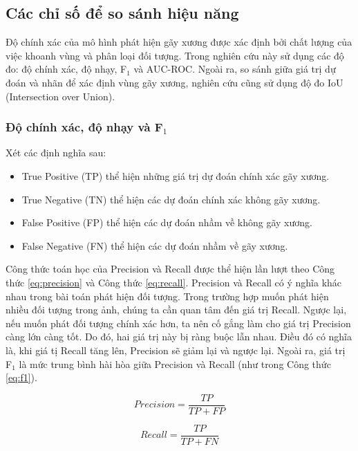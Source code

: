 \documentclass[../the.tex]{subfiles}
\begin{document}
\subsection{Các chỉ số để so sánh hiệu năng}

{\fontsize{13}{12} \selectfont
	Độ chính xác của mô hình phát hiện gãy xương được xác định bởi chất lượng của việc khoanh vùng và phân loại đối tượng. Trong nghiên cứu này sử dụng các độ đo: độ chính xác, độ nhạy, F$_1$ và AUC-ROC. Ngoài ra, so sánh giữa giá trị dự đoán và nhãn để xác định vùng gãy xương, nghiên cứu cũng sử dụng độ đo IoU (Intersection over Union).
}

\subsubsection*{Độ chính xác, độ nhạy và F$_1$}

{\fontsize{13}{12} \selectfont
	Xét các định nghĩa sau:
	\begin {itemize}
	\item True Positive (TP) thể hiện những giá trị dự đoán chính xác gãy xương.
	\item True Negative (TN) thể hiện các dự đoán chính xác không gãy xương.
	\item False Positive (FP) thể hiện các dự đoán nhầm về không gãy xương.
	\item False Negative (FN) thể hiện các dự đoán nhầm về gãy xương.
	\end {itemize}

	Công thức toán học của Precision và Recall được thể hiện lần lượt theo Công thức \ref{eq:precision} và Công thức \ref{eq:recall}. Precision và Recall có ý nghĩa khác nhau trong bài toán phát hiện đối tượng. Trong trường hợp muốn phát hiện nhiều đối tượng trong ảnh, chúng ta cần quan tâm đến giá trị Recall. Ngược lại, nếu muốn phát đối tượng chính xác hơn, ta nên cố gắng làm cho giá trị Precision càng lớn càng tốt. Do đó, hai giá trị này bị ràng buộc lẫn nhau. Điều đó có nghĩa là, khi giá tị Recall tăng lên, Precision sẽ giảm lại và ngược lại. Ngoài ra, giá trị F$_1$ là mức trung bình hài hòa giữa Precision và Recall (như trong Công thức \ref{eq:f1}).
}

\begin{equation}
	Precision = \frac{TP}{TP + FP}
	\label{eq:precision}
\end{equation}

\begin{equation}
	Recall = \frac{TP}{TP + FN}
	\label{eq:recall}
\end{equation}
\end{document}

